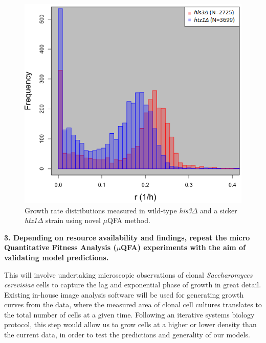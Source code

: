 \documentclass{bioinfo}
\begin{document}
\begin{figure}[H]
\centering
\includegraphics[width=0.8\linewidth]{GrowthRateDistr.png}
\caption{Growth rate distributions measured in wild-type \textit{his3}$\Delta$ and a sicker \textit{htz1}$\Delta$ strain using novel $\mu$QFA method.}
\label{fig:GrowthRateDistr}
\vspace{-2em}
\end{figure}

\textbf{3. Depending on resource availability and findings, repeat the micro Quantitative Fitness Analysis ($\mu$QFA) experiments with the aim of validating model predictions.}
\begin{addmargin}[1.5em]{1.5em}
This will involve undertaking microscopic observations of clonal \textit{Saccharomyces cerevisiae} cells to capture the lag and exponential phase of growth in great detail. Existing in-house image analysis software will be used for generating growth curves from the data, where the measured area of clonal cell cultures translates to the total number of cells at a given time. Following an iterative systems biology protocol, this step would allow us to grow cells at a higher or lower density than the current data, in order to test the predictions and generality of our models. 
\end{addmargin}
\end{document}
